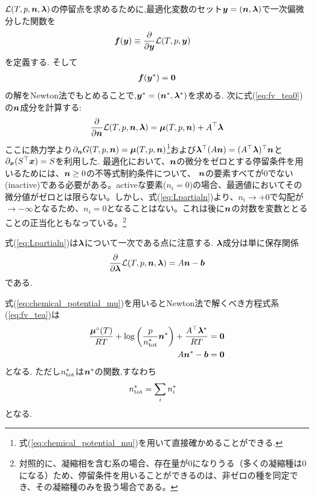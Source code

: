 $\mathcal{L}(T, p, \boldsymbol{n}, \boldsymbol{\lambda})$の停留点を求めるために,最適化変数のセット$\boldsymbol{y} = (\boldsymbol{n}, \boldsymbol{\lambda})$で一次偏微分した関数を
\begin{align}
\label{eq:fv_tea0}
    \boldsymbol{f}(\boldsymbol{y}) &\equiv \frac{\partial  }{\partial \boldsymbol{y}} \mathcal{L}(T, p, \boldsymbol{y}) 
\end{align}
を定義する. そして
\begin{align}
    \label{eq:fv_tea}
    \boldsymbol{f}(\boldsymbol{y}^\ast) = \boldsymbol{0}
\end{align}
の解をNewton法でもとめることで,$\boldsymbol{y}^\ast = (\boldsymbol{n}^\ast, \boldsymbol{\lambda}^\ast)$を求める. 次に式(\ref{eq:fv_tea0})の$\boldsymbol{n}$成分を計算する:
\begin{align}
\label{eq:Lpartialn}
    \frac{\partial}{\partial \boldsymbol{n}}   \mathcal{L}(T, p, \boldsymbol{n}, \boldsymbol{\lambda}) =  \boldsymbol{\mu} (T, p, \boldsymbol{n}) + A^\top \boldsymbol{\lambda}  
\end{align}
ここに熱力学より$\partial_{\boldsymbol{n}} G(T, p, \boldsymbol{n}) =  \boldsymbol{\mu} (T, p, \boldsymbol{n})$\footnote{式(\ref{eq:chemical_potential_mu})を用いて直接確かめることができる. }および$\boldsymbol{\lambda}^\top (A \boldsymbol{n}) = (A^\top \boldsymbol{\lambda})^\top \boldsymbol{n}$と$\partial_{\boldsymbol{x}} (S^\top \boldsymbol{x}) = S$を利用した. 
最適化において、$\boldsymbol{n}$の微分をゼロとする停留条件を用いるためには、$\boldsymbol{n} \ge 0$の不等式制約条件について、 $\boldsymbol{n}$の要素すべてが0でない(inactive)である必要がある。activeな要素($n_i=0$)の場合、最適値においてその微分値がゼロとは限らない。しかし、式(\ref{eq:Lpartialn})より、$n_i \to +0$で勾配が$\to -\infty$となるため、$n_i = 0$となることはない。これは後に$\boldsymbol{n}$の対数を変数ととることの正当化ともなっている。\footnote{対照的に、凝縮相を含む系の場合、存在量が0になりうる（多くの凝縮種は0になる）ため、停留条件を用いることができるのは、非ゼロの種を同定でき、その凝縮種のみを扱う場合である。
}

式(\ref{eq:Lpartialn})は$\boldsymbol{\lambda}$について一次である点に注意する. $\boldsymbol{\lambda}$成分は単に保存関係
\begin{align}
\label{eq:Lpartiall}
\frac{\partial}{\partial \boldsymbol{\lambda}}  \mathcal{L}(T, p, \boldsymbol{n}, \boldsymbol{\lambda}) = A \boldsymbol{n} - \boldsymbol{b}  
\end{align}
である. 

式(\ref{eq:chemical_potential_mu})を用いるとNewton法で解くべき方程式系(\ref{eq:fv_tea})は
\begin{align}
\label{eq:Lpartialnx}
    \frac{\boldsymbol{\mu}^\circ(T)}{RT}+ \log{\left(\frac{p}{n_\mathrm{tot}^\ast} \boldsymbol{n}^\ast \right)} + \frac{A^\top \boldsymbol{\lambda}^\ast}{RT}   &= \boldsymbol{0} \\
    A \boldsymbol{n}^\ast - \boldsymbol{b} &= \boldsymbol{0}
\end{align}
となる. ただし$n_\mathrm{tot}^\ast$は$\boldsymbol{n}^\ast$の関数,すなわち
\begin{align}
n_\mathrm{tot}^\ast &= \sum_i n_i^\ast
\end{align}
となる. 


